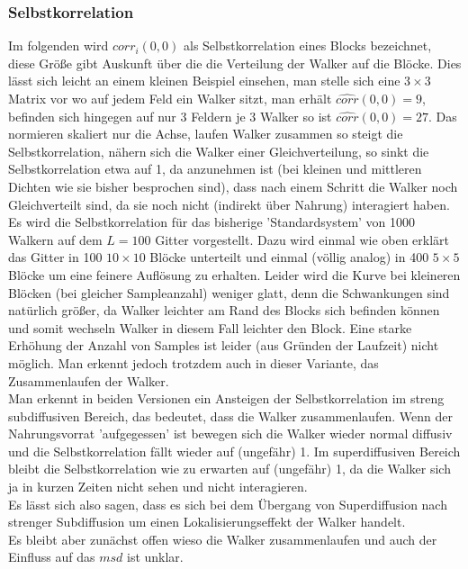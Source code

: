 \documentclass[a4paper, 12pt]{scrartcl}
\begin{document}
\subsubsection{Selbstkorrelation}
\noindent Im folgenden wird $corr_i(0,0)$ als Selbstkorrelation eines Blocks bezeichnet, diese Größe gibt Auskunft über die die Verteilung der Walker auf die Blöcke. Dies lässt sich leicht an einem kleinen Beispiel einsehen, man stelle sich eine $3\times 3$ Matrix vor wo auf jedem Feld ein Walker sitzt, man erhält $\hat{corr}(0,0)=9$, befinden sich hingegen auf nur 3 Feldern je 3 Walker so ist $\hat{corr}(0,0)=27$. Das normieren skaliert nur die Achse, laufen Walker zusammen so steigt die Selbstkorrelation, nähern sich die Walker einer Gleichverteilung, so sinkt die Selbstkorrelation etwa auf 1, da anzunehmen ist (bei kleinen und mittleren Dichten wie sie bisher besprochen sind), dass nach einem Schritt die Walker noch Gleichverteilt sind, da sie noch nicht (indirekt über Nahrung) interagiert haben.
\\
\noindent Es wird die Selbstkorrelation für das bisherige 'Standardsystem' von 1000 Walkern auf dem $L=100$ Gitter vorgestellt. Dazu wird einmal wie oben erklärt das Gitter in 100 $10\times 10$ Blöcke unterteilt und einmal (völlig analog) in 400 $5\times 5$ Blöcke um eine feinere Auflösung zu erhalten. Leider wird die Kurve bei kleineren Blöcken (bei gleicher Sampleanzahl) weniger glatt, denn die Schwankungen sind natürlich größer, da Walker leichter am Rand des Blocks sich befinden können und somit wechseln Walker in diesem Fall leichter den Block. Eine starke Erhöhung der Anzahl von Samples ist leider (aus Gründen der Laufzeit) nicht möglich. Man erkennt jedoch trotzdem auch in dieser Variante, das Zusammenlaufen der Walker. 
\\
\noindent Man erkennt in beiden Versionen ein Ansteigen der Selbstkorrelation im streng subdiffusiven Bereich, das bedeutet, dass die Walker zusammenlaufen. Wenn der Nahrungsvorrat 'aufgegessen' ist bewegen sich die Walker wieder normal diffusiv und die Selbstkorrelation fällt wieder auf (ungefähr) 1. Im superdiffusiven Bereich bleibt die Selbstkorrelation wie zu erwarten auf (ungefähr) 1, da die Walker sich ja in kurzen Zeiten nicht sehen und nicht interagieren.
\\
\noindent Es lässt sich also sagen, dass es sich bei dem Übergang von Superdiffusion nach strenger Subdiffusion um einen Lokalisierungseffekt der Walker handelt. 
\\
\noindent Es bleibt aber zunächst offen wieso die Walker zusammenlaufen und auch der Einfluss auf das $msd$ ist unklar.
\end{document}
